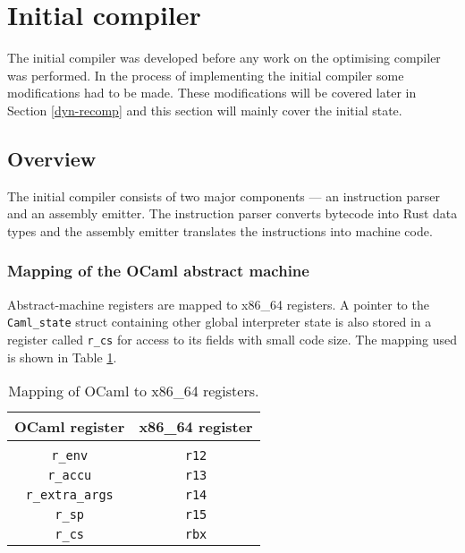 \section{Initial compiler}

The initial compiler was developed before any work on the optimising compiler was performed. In the
process of implementing the initial compiler some modifications had to be made. These modifications
will be covered later in Section \ref{dyn-recomp} and this section will mainly cover the initial
state.

\subsection{Overview}

The initial compiler consists of two major components --- an instruction parser and an assembly
emitter. The instruction parser converts bytecode into Rust data types and the assembly emitter
translates the instructions into machine code.

\subsubsection{Mapping of the OCaml abstract machine}

Abstract-machine registers are mapped to x86\_64 registers. A pointer to the \texttt{Caml\_state}
struct containing other global interpreter state is also stored in a register called \texttt{r\_cs}
for access to its fields with small code size. The mapping used is shown in Table
\ref{table:regmap}.

\begin{table}[h]
      \centering
      \begin{tabular}{cc}\toprule
            OCaml register          & x86\_64 register \\
            \midrule                                   \\
            \texttt{r\_env}         & \texttt{r12}     \\
            \texttt{r\_accu}        & \texttt{r13}     \\
            \texttt{r\_extra\_args} & \texttt{r14}     \\
            \texttt{r\_sp}          & \texttt{r15}     \\
            \texttt{r\_cs}          & \texttt{rbx}     \\
            \bottomrule
      \end{tabular}

      \caption{Mapping of OCaml to x86\_64 registers.}
      \label{table:regmap}
\end{table}

